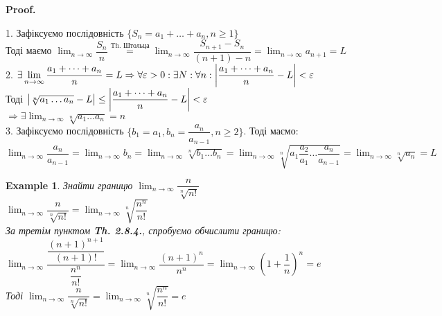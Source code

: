 \documentclass[a4paper, 14pt]{article}
\makeatletter
\def\qed{$\blacksquare$}
\theoremstyle{theoremdd}
\theoremstyle{theoremdd}
\theoremstyle{theoremdd}
\theoremstyle{theoremdd}
\newtheorem{example}[theorem]{Example}
\theoremstyle{theoremdd}
\theoremstyle{theoremdd}
\theoremstyle{theoremdd}
\theoremstyle{theoremdd}
\renewenvironment{proof}[1][Proof.\\]{\par
\pushQED{\hfill \qed}%
\normalfont \topsep6\p@\@plus6\p@\relax
\trivlist
\item\relax
{\bfseries
#1\@addpunct{.}}\hspace\labelsep\ignorespaces
}{%
\popQED\endtrivlist\@endpefalse
}
\makeatother
\begin{document}
	\begin{proof}
	1. Зафіксуємо послідовність $\{S_n = a_1 + \dots + a_n, n \geq 1\}$\\
	Тоді маємо $\displaystyle \lim_{n \to \infty} \dfrac{S_n}{n} \overset{\text{Th. Штольца}}{=} \lim_{n \to \infty} \dfrac{S_{n+1} - S_n}{(n+1) - n} = \lim_{n \to \infty} a_{n+1} = L$
	\bigskip \\
	2. $\exists \displaystyle \lim_{n \to \infty} \dfrac{a_1+\dots+a_n}{n} = L \Rightarrow \forall \varepsilon > 0: \exists N: \forall n: \abs{\dfrac{a_1+\dots+a_n}{n} - L} < \varepsilon$\\
	Тоді $\abs{\sqrt[n]{a_1 \dots a_n} - L} \leq \abs{\dfrac{a_1+\dots+a_n}{n} - L} < \varepsilon$\\
	$\Rightarrow \exists \displaystyle \lim_{n \to \infty} \sqrt[n]{a_1 \dots a_n} = n$
	\bigskip \\
	3. Зафіксуємо послідовність $\{b_1 = a_1, b_n = \dfrac{a_{n}}{a_{n-1}}, n \geq 2\}$. Тоді маємо:\\
	$\displaystyle \lim_{n \to \infty} \dfrac{a_{n}}{a_{n-1}} = \lim_{n \to \infty} b_n = \lim_{n \to \infty} \sqrt[n]{b_1 \dots b_n} = \lim_{n \to \infty} \sqrt[n]{a_1 \dfrac{a_2}{a_1} \dots \dfrac{a_n}{a_{n-1}}} = \lim_{n \to \infty} \sqrt[n]{a_n} = L$
	\end{proof}
	
	\begin{example}
	Знайти границю $\displaystyle \lim_{n \to \infty} \dfrac{n}{\sqrt[n]{n!}}$\\
	$\displaystyle \lim_{n \to \infty} \dfrac{n}{\sqrt[n]{n!}} = \lim_{n \to \infty} \sqrt[n]{\dfrac{n^n}{n!}}$\\
	За третім пунктом \textbf{Th. 2.8.4.}, спробуємо обчислити границю:\\
	$\displaystyle \lim_{n \to \infty} \dfrac{\dfrac{(n+1)^{n+1}}{(n+1)!}}{\dfrac{n^n}{n!}} = \lim_{n \to \infty} \dfrac{(n+1)^n}{n^n} = \lim_{n \to \infty} \left(1 + \dfrac{1}{n} \right)^n = e$\\
	Тоді $\displaystyle \lim_{n \to \infty} \dfrac{n}{\sqrt[n]{n!}} = \lim_{n \to \infty} \sqrt[n]{\dfrac{n^n}{n!}} = e$
	\end{example}
	
	
	\newpage
	
	\setcounter{section}{0}	
\end{document}
